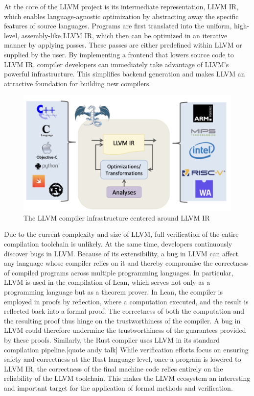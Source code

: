 At the core of the LLVM project is its intermediate representation, LLVM IR, which enables language-agnostic optimization by abstracting away the specific features of source languages. Programs are first translated into the uniform, high-level, assembly-like LLVM IR, which then can be optimized in an iterative manner by applying passes. These passes are either predefined within LLVM or supplied by the user. By implementing a frontend that lowers source code to LLVM IR, compiler developers can immediately take advantage of LLVM's powerful infrastructure. This  simplifies backend generation and makes LLVM an attractive foundation for building new compilers.

\begin{figure}[htbp]
  \centering
  \includegraphics[scale=0.4]{thesis/llvm.png}
 
  \caption{The LLVM compiler infrastructure centered around LLVM IR}
  \label{fig:your-label}
\end{figure}

Due to the current complexity and size of LLVM, full verification of the entire compilation toolchain is unlikely. At the same time, developers continuously discover bugs in LLVM. Because of its extensibility, a bug in LLVM can affect any language whose compiler relies on it and thereby compromise the correctness of compiled programs across multiple programming languages.
In particular, LLVM is used in the compilation of Lean, which serves not only as a programming language but  as a theorem prover. In Lean, the compiler is employed in proofs by reflection, where a computation  executed, and the result is reflected back into a formal proof. The correctness of both the computation and the resulting proof thus hinge on the trustworthiness of the compiler. A bug in LLVM could therefore undermine the trustworthiness of the guarantees provided by these proofs. Similarly, the Rust compiler uses LLVM in its standard compilation pipeline.[quote andy talk] While verification efforts focus on ensuring safety and correctness at the Rust language level, once a program is lowered to LLVM IR, the correctness of the final machine code relies entirely on the reliability of the LLVM toolchain. This makes the LLVM ecosystem an interesting and important target for the application of formal methods and verification.

